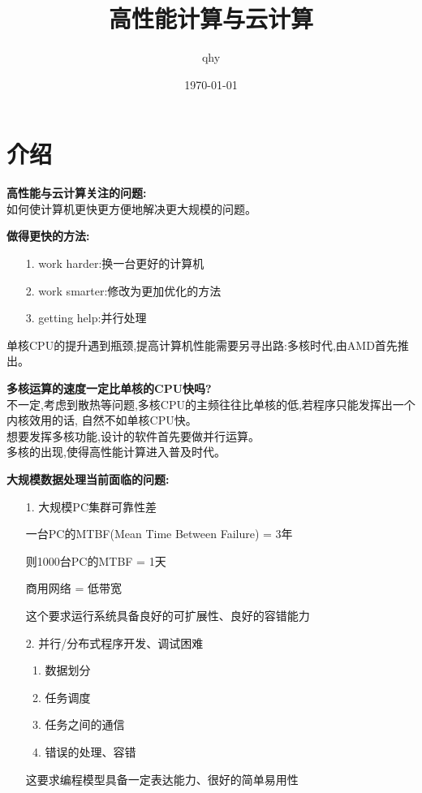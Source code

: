 \documentclass[UTF8,a4paper]{ctexart}
\author{ qhy }
\date{\today}
\title{高性能计算与云计算}
\newcommand{\spaceline}{\vspace{\baselineskip}}
\begin{document}
  \maketitle
  \tableofcontents
  \newpage

  \section{介绍}

  \textbf{高性能与云计算关注的问题:}\\
  如何使计算机更快更方便地解决更大规模的问题。

  \spaceline
  \textbf{做得更快的方法:}
  \begin{enumerate}
    \item [1.] work harder:换一台更好的计算机

    \item [2.] work smarter:修改为更加优化的方法

    \item [3.] getting help:并行处理
  \end{enumerate}

  单核CPU的提升遇到瓶颈,提高计算机性能需要另寻出路:多核时代,由AMD首先推出。

  \spaceline
  \textbf{多核运算的速度一定比单核的CPU快吗?}\\
  不一定,考虑到散热等问题,多核CPU的主频往往比单核的低,若程序只能发挥出一个内核效用的话,
  自然不如单核CPU快。\\
  想要发挥多核功能,设计的软件首先要做并行运算。\\
  多核的出现,使得高性能计算进入普及时代。

  \spaceline
  \textbf{大规模数据处理当前面临的问题:}
  \begin{enumerate}
    \item [1.] 大规模PC集群可靠性差

    一台PC的MTBF(Mean Time Between Failure) = 3年

    则1000台PC的MTBF = 1天

    商用网络 = 低带宽

    这个要求运行系统具备良好的可扩展性、良好的容错能力

    \item [2.] 并行/分布式程序开发、调试困难

    \begin{enumerate}
      \item 数据划分
      \item 任务调度
      \item 任务之间的通信
      \item 错误的处理、容错
    \end{enumerate}

    这要求编程模型具备一定表达能力、很好的简单易用性
  \end{enumerate}
\end{document}
